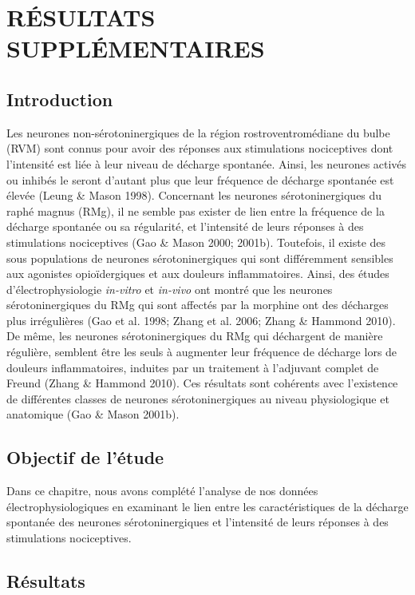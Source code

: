 \documentclass[a4paper,12pt,twoside]{report}
\begin{document}
\section{RÉSULTATS SUPPLÉMENTAIRES}

\subsection{Introduction}

Les neurones non-sérotoninergiques de la région rostroventromédiane du bulbe (RVM) sont connus pour avoir des réponses aux stimulations nociceptives dont l’intensité est liée à leur niveau de décharge spontanée. Ainsi, les neurones activés ou inhibés le seront d’autant plus que leur fréquence de décharge spontanée est élevée (Leung \& Mason 1998). Concernant les neurones sérotoninergiques du raphé magnus (RMg), il ne semble pas exister de lien entre la fréquence de la décharge spontanée ou sa régularité, et l’intensité de leurs réponses à des stimulations nociceptives (Gao \& Mason 2000; 2001b). Toutefois, il existe des sous populations de neurones sérotoninergiques qui sont différemment sensibles aux agonistes opioïdergiques et aux douleurs inflammatoires. Ainsi, des études d’électrophysiologie \textit{in-vitro} et \textit{in-vivo} ont montré que les neurones sérotoninergiques du RMg qui sont affectés par la morphine ont des décharges plus irrégulières (Gao et al. 1998; Zhang et al. 2006; Zhang \& Hammond 2010). De même, les neurones sérotoninergiques du RMg qui déchargent de manière régulière, semblent être les seuls à augmenter leur fréquence de décharge lors de douleurs inflammatoires, induites par un traitement à l’adjuvant complet de Freund (Zhang \& Hammond 2010). Ces résultats sont cohérents avec l’existence de différentes classes de neurones sérotoninergiques au niveau physiologique et anatomique (Gao \& Mason 2001b).

\subsection{Objectif de l’étude}

Dans ce chapitre, nous avons complété l’analyse de nos données électrophysiologiques en examinant le lien entre les caractéristiques de la décharge spontanée des neurones sérotoninergiques et l’intensité de leurs réponses à des stimulations nociceptives.

\subsection{Résultats}
\end{document}
